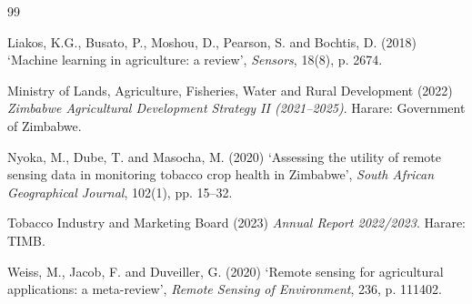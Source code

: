 \documentclass[12pt,a4paper]{report}
\begin{document}

\setcounter{chapter}{6}   %



\clearpage
{}

\begin{thebibliography}{99}

Liakos, K.G., Busato, P., Moshou, D., Pearson, S. and Bochtis, D. (2018) `Machine learning in agriculture: a review', \textit{Sensors}, 18(8), p. 2674.

Ministry of Lands, Agriculture, Fisheries, Water and Rural Development (2022) \textit{Zimbabwe Agricultural Development Strategy II (2021--2025)}. Harare: Government of Zimbabwe.

Nyoka, M., Dube, T. and Masocha, M. (2020) `Assessing the utility of remote sensing data in monitoring tobacco crop health in Zimbabwe', \textit{South African Geographical Journal}, 102(1), pp. 15--32.

Tobacco Industry and Marketing Board (2023) \textit{Annual Report 2022/2023}. Harare: TIMB.

Weiss, M., Jacob, F. and Duveiller, G. (2020) `Remote sensing for agricultural applications: a meta-review', \textit{Remote Sensing of Environment}, 236, p. 111402.

\end{thebibliography}
\end{document}
